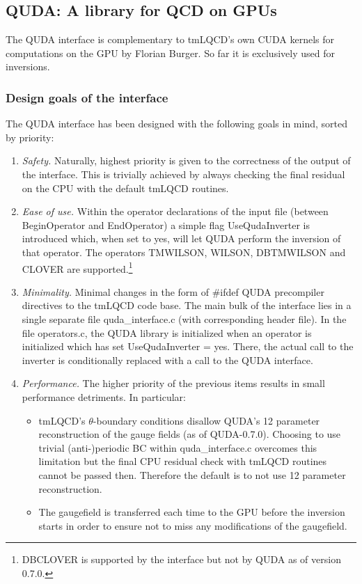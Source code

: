 
\subsection{QUDA: A library for QCD on GPUs}


The QUDA \cite{Clark:2009wm, Babich:2011np, Strelchenko:2013vaa} interface is complementary to tmLQCD's own CUDA kernels for computations on the GPU by Florian Burger.
So far it is exclusively used for inversions.

\subsubsection{Design goals of the interface}
The QUDA interface has been designed with the following goals in mind, sorted by priority:
\begin{enumerate}
	\item \emph{Safety.} Naturally, highest priority is given to the correctness of the output of the interface. 
	This is trivially achieved by always checking the final residual on the CPU with the default tmLQCD routines.
	\item \emph{Ease of use.} Within the operator declarations of the input file (between {\ttfamily BeginOperator} and {\ttfamily EndOperator}) a simple flag {\ttfamily UseQudaInverter} is introduced which, when set to {\ttfamily yes}, will let QUDA perform the inversion of that operator. The operators {\ttfamily TMWILSON, WILSON, DBTMWILSON} and {\ttfamily CLOVER} are supported.\footnote{{\ttfamily DBCLOVER} is supported by the interface but not by QUDA as of version 0.7.0.}
	\item \emph{Minimality.} Minimal changes in the form of {\ttfamily \#ifdef QUDA} precompiler directives to the tmLQCD code base. The main bulk of the interface lies in a single separate file {\ttfamily quda\_interface.c} (with corresponding header file). In the file {\ttfamily operators.c}, the QUDA library is initialized when an operator is initialized which has set {\ttfamily UseQudaInverter = yes}. There, the actual call to the inverter is conditionally replaced with a call to the QUDA interface.
	\item \emph{Performance.} The higher priority of the previous items results in small performance detriments. In particular:
	\begin{itemize}
		\item tmLQCD's $\theta$-boundary conditions disallow QUDA's 12 parameter reconstruction of the gauge fields (as of QUDA-0.7.0). Choosing to use trivial (anti-)periodic BC within {\ttfamily quda\_interface.c} overcomes this limitation but the final CPU residual check with tmLQCD routines cannot be passed then. Therefore the default is to not use 12 parameter reconstruction.
		\item The gaugefield is transferred each time to the GPU before the inversion starts in order to ensure not to miss any modifications of the gaugefield.
	\end{itemize}
\end{enumerate}


